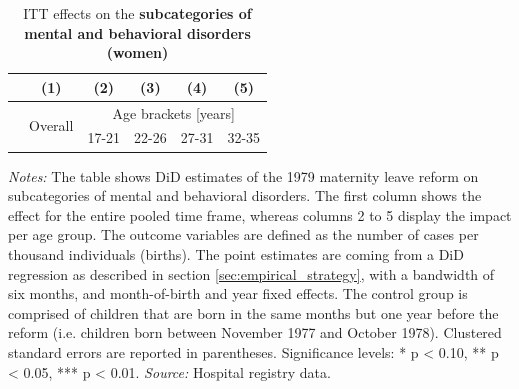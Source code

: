 \documentclass[11pt, a4paper]{article} %
\begin{document}
\newpage
{} 
\vspace*{\fill}
\begin{table}[H] \centering 
	\begin{threeparttable} \centering \caption{ITT effects on the \textbf{subcategories of mental and behavioral disorders (women)}}\label{tab: ITT_across_d5subcategories_per_age_group_women}
		{\def\sym#1{\ifmmode^{#1}\else\(^{#1}\)\fi} 
			\begin{tabular}{l*{5}{c}}
				\toprule 
				&\multicolumn{1}{c}{(1)}&\multicolumn{1}{c}{(2)}&\multicolumn{1}{c}{(3)}&\multicolumn{1}{c}{(4)}&\multicolumn{1}{c}{(5)}\\
				\midrule
				&\multirow{2}{*}{Overall} & \multicolumn{4}{c}{Age brackets [years]} \\ 
				\cmidrule(lr){3-6}
				&&\multicolumn{1}{c}{17-21}&\multicolumn{1}{c}{22-26}&\multicolumn{1}{c}{27-31}&\multicolumn{1}{c}{32-35}\\
				
				\midrule
				
				
				
				\bottomrule 
		\end{tabular}}
	\end{threeparttable} 
	\begin{minipage}{0.9\linewidth}
		\scriptsize \emph{Notes:} The table shows DiD estimates of the 1979 maternity leave reform on subcategories of mental and behavioral disorders. The first column shows the effect for the entire pooled time frame, whereas columns 2 to 5 display the impact per age group. The outcome variables are defined as the number of cases per thousand individuals (births). The point estimates are coming from a DiD regression as described in section \ref{sec:empirical_strategy}, with a bandwidth of six months, and month-of-birth and year fixed effects. The control group is comprised of children that are born in the same months but one year before the reform (i.e. children born between November 1977 and October 1978). Clustered standard errors are reported in parentheses. \newline Significance levels: * p < 0.10, ** p < 0.05, *** p < 0.01. \newline 	\emph{Source:} Hospital registry data.
	\end{minipage}
\end{table} 
\vspace*{\fill}\clearpage 
\restoregeometry
\end{document}
